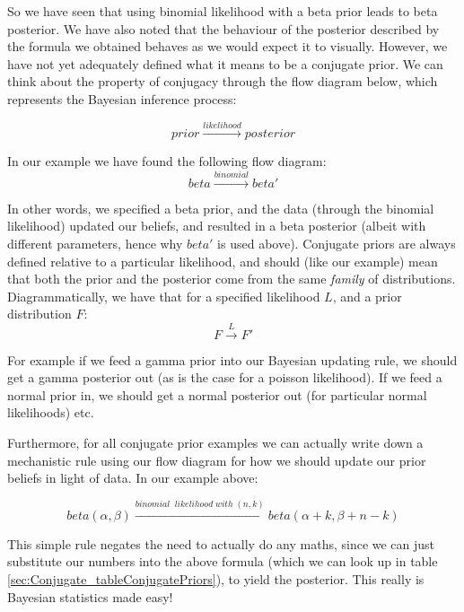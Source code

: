 \documentclass[11pt,fullpage]{book}
\begin{document}
So we have seen that using binomial likelihood with a beta prior leads to beta posterior. We have also noted that the behaviour of the posterior described by the formula we obtained behaves as we would expect it to visually. However, we have not yet adequately defined what it means to be a conjugate prior. We can think about the property of conjugacy through the flow diagram below, which represents the Bayesian inference process:

\begin{equation}
prior\xrightarrow{likelihood} posterior 
\end{equation}

In our example we have found the following flow diagram:
\begin{equation}
beta\xrightarrow{binomial} beta'
\end{equation}

In other words, we specified a beta prior, and the data (through the binomial likelihood) updated our beliefs, and resulted in a beta posterior (albeit with different parameters, hence why $beta'$ is used above). Conjugate priors are always defined relative to a particular likelihood, and should (like our example) mean that both the prior and the posterior come from the same \textit{family} of distributions. Diagrammatically, we have that for a specified likelihood $L$, and a prior distribution $F$:
\begin{equation}
F\xrightarrow{L} F'
\end{equation}

For example if we feed a gamma prior into our Bayesian updating rule, we should get a gamma posterior out (as is the case for a poisson likelihood). If we feed a normal prior in, we should get a normal posterior out (for particular normal likelihoods) etc.

Furthermore, for all conjugate prior examples we can actually write down a mechanistic rule using our flow diagram for how we should update our prior beliefs in light of data. In our example above:

\begin{equation}
beta(\alpha,\beta)\xrightarrow{binomial\;\; likelihood\; with\; (n, k)} beta(\alpha+k,\beta+n-k)
\end{equation}

This simple rule negates the need to actually do any maths, since we can just substitute our numbers into the above formula (which we can look up in table \ref{sec:Conjugate_tableConjugatePriors}), to yield the posterior. This really is Bayesian statistics made easy!
\end{document}
